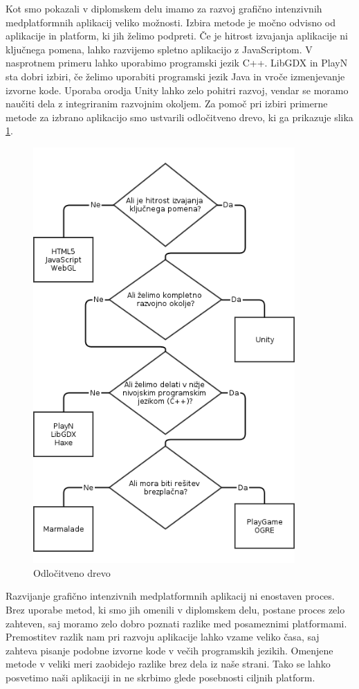 Kot smo pokazali v diplomskem delu imamo za razvoj grafično intenzivnih medplatformnih aplikacij veliko možnosti. Izbira metode je močno odvisno od aplikacije in platform, ki jih želimo podpreti. Če je hitrost izvajanja aplikacije ni ključnega pomena, lahko razvijemo spletno aplikacijo z JavaScriptom. V nasprotnem primeru lahko uporabimo programski jezik C++. LibGDX in PlayN sta dobri izbiri, če želimo uporabiti programski jezik Java in vroče izmenjevanje izvorne kode. Uporaba orodja Unity lahko zelo pohitri razvoj, vendar se moramo naučiti dela z integriranim razvojnim okoljem. Za pomoč pri izbiri primerne metode za izbrano aplikacijo smo ustvarili odločitveno drevo, ki ga prikazuje slika \ref{drevo}. 

\begin{figure}
\begin{center}
\includegraphics[width=10cm]{pic/drevo.png}
\end{center}
\caption{Odločitveno drevo}
\label{drevo}
\end{figure} 


Razvijanje grafično intenzivnih medplatformnih aplikacij ni enostaven proces. Brez uporabe metod, ki smo jih omenili v diplomskem delu, postane proces zelo zahteven, saj moramo zelo dobro poznati razlike med posameznimi platformami. Premostitev razlik nam pri razvoju aplikacije lahko vzame veliko časa, saj zahteva pisanje podobne izvorne kode v večih programskih jezikih. Omenjene metode v veliki meri zaobidejo razlike brez dela iz naše strani. Tako se lahko posvetimo naši aplikaciji in ne skrbimo glede posebnosti ciljnih platform.